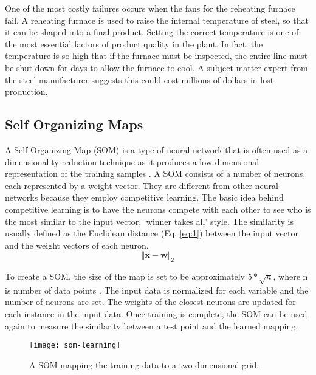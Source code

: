 One of the most costly failures occurs when the fans for the reheating furnace fail.
A reheating furnace is used to raise the internal temperature of steel, so that it can be shaped into a final product.
Setting the correct temperature is one of the most essential factors of product quality in the plant.
In fact, the temperature is so high that if the furnace must be inspected, the entire line must be shut down for days to allow the furnace to cool.
A subject matter expert from the steel manufacturer suggests this could cost millions of dollars in lost production.




\subsection{Self Organizing Maps}

A Self-Organizing Map (SOM) is a type of neural network that is often used as a dimensionality reduction technique as it produces a low dimensional representation of the training samples \cite{kohonen1997exploration}.
A SOM consists of a number of neurons, each represented by a weight vector. 
They are different from other neural networks because they employ competitive learning.
The basic idea behind competitive learning is to have the neurons compete with each other to see who is the most similar to the input vector, `winner takes all' style.
The similarity is usually defined as the Euclidean distance (Eq. \ref{eq:1}) between the input vector and the weight vectors of each neuron.
\begin{equation} \label{eq:1}
    \Vert \boldsymbol{x - w} \Vert_2
\end{equation}

To create a SOM, the size of the map is set to be approximately $5*\sqrt{n}$, where n is number of data points \cite{Tian2014AnomalyDU}. 
The input data is normalized for each variable and the number of neurons are set.
The weights of the closest neurons are updated for each instance in the input data.
Once training is complete, the SOM can be used again to measure the similarity between a test point and the learned mapping.


\begin{figure}[!h]
    \centering
    \texttt{[image: som-learning]}
    \caption{A SOM mapping the training data to a two dimensional grid.}
    \label{fig:som-learning}
\end{figure}
